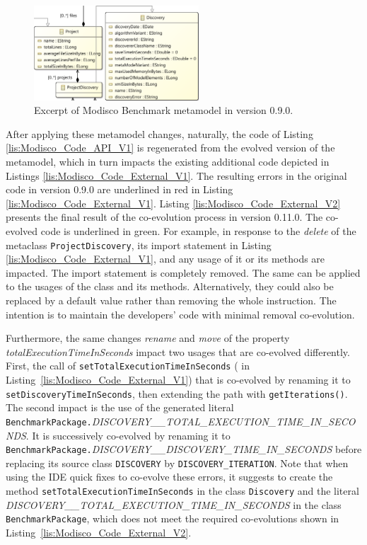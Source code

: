\begin{figure}
	
	\centering
	\includegraphics[width=0.55\textwidth]{./pics/chapter1pics/example.PNG}
	\caption{Excerpt of Modisco Benchmark metamodel in version 0.9.0.}
	\label{fig: BMM}
	\vspace{-5mm}
\end{figure}

After applying these metamodel changes, naturally, the code of Listing \ref{lis:Modisco_Code_API_V1} is regenerated from the evolved version of the metamodel, which in turn impacts the existing additional code depicted in Listings \ref{lis:Modisco_Code_External_V1}. 
The resulting errors in the original code in version 0.9.0 are underlined in red in Listing \ref{lis:Modisco_Code_External_V1}. 
Listing \ref{lis:Modisco_Code_External_V2} presents the final result of the co-evolution process in version 0.11.0. The co-evolved code is underlined in green. 
For example, in response to the \textit{delete} of the metaclass \texttt{ProjectDiscovery}, its import statement {\small{}} in Listing \ref{lis:Modisco_Code_External_V1}, and any usage of it or its methods are impacted. The import statement is completely removed. The same can be applied to the usages of the class and its methods. Alternatively, they could also be replaced by a default value rather than removing the whole instruction. The intention is to maintain the developers' code with minimal removal co-evolution. 

Furthermore, the same changes \textit{rename} and \textit{move} of the property \emph{totalExecutionTimeInSeconds} impact two usages that are co-evolved differently. First, the call of \texttt{setTotalExecutionTimeInSeconds} ({\small{}} in Listing~\ref{lis:Modisco_Code_External_V1}) that is co-evolved by renaming it to \texttt{setDiscoveryTimeInSeconds}, then extending the path with \texttt{getIterations()}. The second impact is the use of the generated literal \texttt{BenchmarkPackage.}\emph{\footnotesize{DISCOVERY\_\_TOTAL\_EXECUTION\_TIME\_IN\_SECONDS}}. It is successively co-evolved by renaming it to \texttt{BenchmarkPackage.}\emph{\footnotesize{DISCOVERY\_\_DISCOVERY\_TIME\_IN\_SECONDS}} before replacing its source class \texttt{DISCOVERY} by \texttt{DISCOVERY\_ITERATION}. 
Note that when using the IDE quick fixes to co-evolve these errors, it suggests to create the method \texttt{setTotalExecutionTimeInSeconds} in the class \texttt{Discovery} and the literal \emph{\footnotesize{DISCOVERY\_\_TOTAL\_EXECUTION\_TIME\_IN\_SECONDS}} in the class \texttt{BenchmarkPackage}, which does not meet the required co-evolutions shown in Listing~\ref{lis:Modisco_Code_External_V2}.

